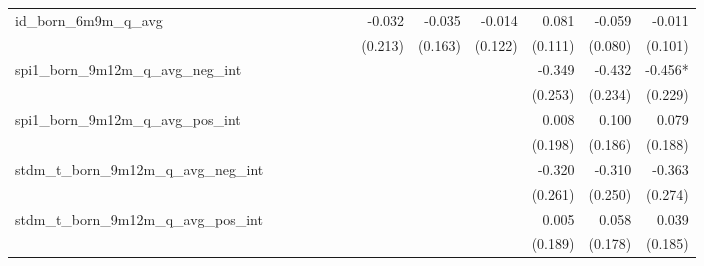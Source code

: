 \begin{tabular}{lrrrrrrrrrrrr}
id\_born\_6m9m\_q\_avg                      &              &              &              &              &              &              &       -0.032 &       -0.035 &       -0.014 &        0.081 &       -0.059 &       -0.011 \\ 
                                            &              &              &              &              &              &              &      (0.213) &      (0.163) &      (0.122) &      (0.111) &      (0.080) &      (0.101) \\ 
spi1\_born\_9m12m\_q\_avg\_neg\_int         &              &              &              &              &              &              &              &              &              &       -0.349 &       -0.432 &      -0.456* \\ 
                                            &              &              &              &              &              &              &              &              &              &      (0.253) &      (0.234) &      (0.229) \\ 
spi1\_born\_9m12m\_q\_avg\_pos\_int         &              &              &              &              &              &              &              &              &              &        0.008 &        0.100 &        0.079 \\ 
                                            &              &              &              &              &              &              &              &              &              &      (0.198) &      (0.186) &      (0.188) \\ 
stdm\_t\_born\_9m12m\_q\_avg\_neg\_int      &              &              &              &              &              &              &              &              &              &       -0.320 &       -0.310 &       -0.363 \\ 
                                            &              &              &              &              &              &              &              &              &              &      (0.261) &      (0.250) &      (0.274) \\ 
stdm\_t\_born\_9m12m\_q\_avg\_pos\_int      &              &              &              &              &              &              &              &              &              &        0.005 &        0.058 &        0.039 \\ 
                                            &              &              &              &              &              &              &              &              &              &      (0.189) &      (0.178) &      (0.185) \\ 

\end{tabular}
